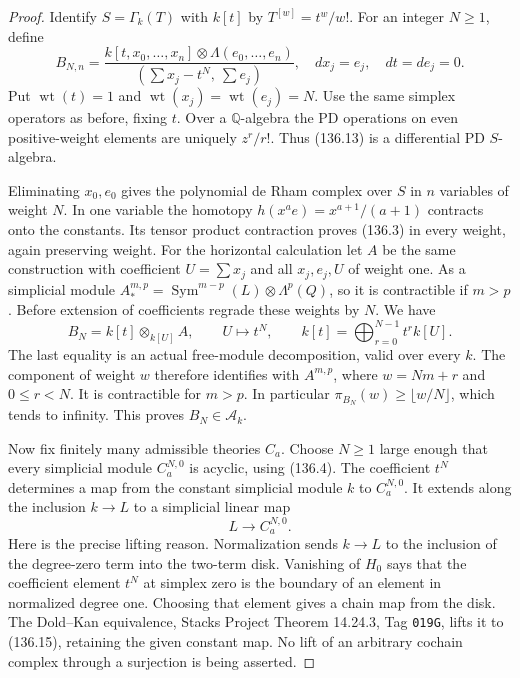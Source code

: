 \documentclass[11pt,a4paper]{article}
\theoremstyle{definition}\newtheorem{definition}[theorem]{Definition}
\theoremstyle{remark}\newtheorem{remark}[theorem]{Remark}
\begin{document}
\begin{proof}
Identify $S=\Gamma_k(T)$ with $k[t]$ by
$T^{[w]}=t^w/w!$.  For an integer $N\geq1$, define
\[
 B_{N,n}=
 \frac{k[t,x_0,\ldots,x_n]\otimes\Lambda(e_0,\ldots,e_n)}
      {(\sum x_j-t^N,\ \sum e_j)},
 \quad dx_j=e_j,\quad dt=de_j=0.                           \tag{136.13}
\]
Put $\operatorname{wt}(t)=1$ and
$\operatorname{wt}(x_j)=\operatorname{wt}(e_j)=N$.
Use the same simplex operators as before, fixing $t$.
Over a $\mathbb Q$-algebra the PD operations on even
positive-weight elements are uniquely $z^r/r!$.
Thus (136.13) is a differential PD $S$-algebra.

Eliminating $x_0,e_0$ gives the polynomial de Rham
complex over $S$ in $n$ variables of weight $N$.
In one variable the homotopy
$h(x^ae)=x^{a+1}/(a+1)$ contracts onto the constants.
Its tensor product contraction proves (136.3) in every
weight, again preserving weight.  For the horizontal
calculation let $A$ be the same construction with
coefficient $U=\sum x_j$ and all $x_j,e_j,U$ of weight
one.  As a simplicial module
$A_*^{m,p}=\operatorname{Sym}^{m-p}(L)\otimes\Lambda^p(Q)$,
so it is contractible if $m>p$.
Before extension of coefficients regrade these weights
by $N$.  We have
\[
 B_N=k[t]\otimes_{k[U]}A,\qquad U\longmapsto t^N,
 \qquad k[t]=\bigoplus_{r=0}^{N-1}t^r k[U].                \tag{136.14}
\]
The last equality is an actual free-module decomposition,
valid over every $k$.  The component of weight $w$
therefore identifies with $A^{m,p}$, where
$w=Nm+r$ and $0\leq r<N$.  It is contractible for
$m>p$.  In particular
$\pi_{B_N}(w)\geq\lfloor w/N\rfloor$, which tends to
infinity.  This proves $B_N\in\mathcal A_k$.

Now fix finitely many admissible theories $C_a$.
Choose $N\geq1$ large enough that every simplicial
module $C_a^{N,0}$ is acyclic, using (136.4).
The coefficient $t^N$ determines a map from the
constant simplicial module $k$ to $C_a^{N,0}$.
It extends along the inclusion $k\to L$ to a
simplicial linear map
\[
                         L\longrightarrow C_a^{N,0}.       \tag{136.15}
\]
Here is the precise lifting reason.  Normalization
sends $k\to L$ to the inclusion of the degree-zero
term into the two-term disk.  Vanishing of $H_0$
says that the coefficient element $t^N$ at simplex
zero is the boundary of an element in normalized
degree one.  Choosing that element gives a chain
map from the disk.  The Dold--Kan equivalence,
Stacks Project Theorem 14.24.3, Tag \nolinkurl{019G},
lifts it to (136.15), retaining the given constant
map.  No lift of an arbitrary cochain complex
through a surjection is being asserted.


\end{proof}
\end{document}
